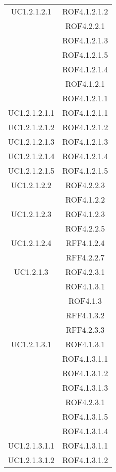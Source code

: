 \begin{longtable}{|c|c|}
\midrule
UC1.2.1.2.1
& ROF4.1.2.1.2\\
& ROF4.2.2.1\\
& ROF4.1.2.1.3\\
& ROF4.1.2.1.5\\
& ROF4.1.2.1.4\\
& ROF4.1.2.1\\
& ROF4.1.2.1.1\\

\midrule
UC1.2.1.2.1.1
& ROF4.1.2.1.1\\

\midrule
UC1.2.1.2.1.2
& ROF4.1.2.1.2\\

\midrule
UC1.2.1.2.1.3
& ROF4.1.2.1.3\\

\midrule
UC1.2.1.2.1.4
& ROF4.1.2.1.4\\

\midrule
UC1.2.1.2.1.5
& ROF4.1.2.1.5\\

\midrule
UC1.2.1.2.2
& ROF4.2.2.3\\
& ROF4.1.2.2\\

\midrule
UC1.2.1.2.3
& ROF4.1.2.3\\
& ROF4.2.2.5\\

\midrule
UC1.2.1.2.4
& RFF4.1.2.4\\
& RFF4.2.2.7\\

\midrule
UC1.2.1.3
& ROF4.2.3.1\\
& ROF4.1.3.1\\
& ROF4.1.3\\
& RFF4.1.3.2\\
& RFF4.2.3.3\\

\midrule
UC1.2.1.3.1
& ROF4.1.3.1\\
& ROF4.1.3.1.1\\
& ROF4.1.3.1.2\\
& ROF4.1.3.1.3\\
& ROF4.2.3.1\\
& ROF4.1.3.1.5\\
& ROF4.1.3.1.4\\

\midrule
UC1.2.1.3.1.1
& ROF4.1.3.1.1\\

\midrule
UC1.2.1.3.1.2
& ROF4.1.3.1.2\\


\end{longtable}
